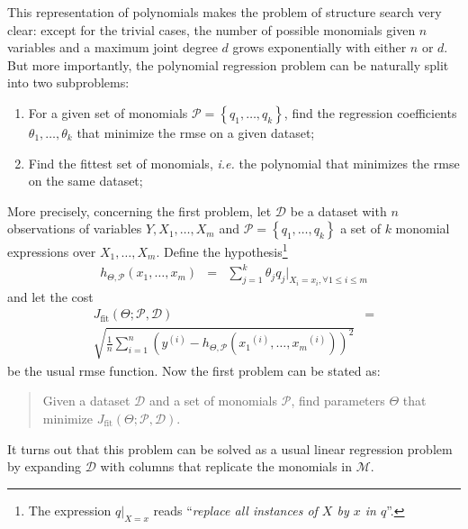 \documentclass[final,authoryear,3p,times,twocolumn]{elsarticle}
\newcommand{\sample}[1]{\ensuremath{^{\left(#1\right)}}}
\begin{document}
This representation of polynomials makes the problem of structure search very clear: except for the trivial cases, the number of possible monomials given $n$ variables and a maximum joint degree $d$ grows exponentially with either $n$ or $d$. But more importantly, the polynomial regression problem can be naturally split into two subproblems:
%
\begin{enumerate}
\item For a given set of monomials $\mathcal{P} = \left\lbrace q_1, \ldots, q_k\right\rbrace$, find the regression coefficients $\theta_1,\ldots,\theta_k$ that minimize the \ac{rmse} on a given dataset;

\item Find the fittest set of monomials, \emph{i.e.} the polynomial that minimizes the \ac{rmse} on the same dataset;
\end{enumerate}
%
More precisely, concerning the first problem, let $\mathcal{D}$ be a dataset with $n$ observations of variables $Y, X_1,\ldots,X_m$ and $\mathcal{P} = \left\lbrace q_1,\ldots, q_k\right\rbrace$ a set of $k$ monomial expressions over $X_1,\ldots,X_m$. Define the hypothesis\footnote{The expression $q|_{X=x}$ reads ``\emph{replace all instances of $X$ by $x$ in $q$}''.}
%
\begin{eqnarray*}
h_{\Theta,\mathcal{P}}\left(x_1,\ldots,x_m\right) &=& \sum_{j = 1}^k \theta_j q_j|_{X_i=x_i,\forall 1 \leq i \leq m}
\end{eqnarray*}
%
and let the cost
%
\begin{eqnarray}
J_{\textrm{fit}}\left(\Theta;\mathcal{P},\mathcal{D}\right)  & =  \nonumber \\
\sqrt{\frac{1}{n}\sum_{i=1}^n \left( y\sample{i} - h_{\Theta,\mathcal{P}}\left( x_1\sample{i},\ldots,x_m\sample{i} \right) \right)^2 }\label{eq:rmse}
\end{eqnarray}
%
be the usual \acf{rmse} function. Now the first problem can be stated as:
%
\begin{quote}
Given a dataset $\mathcal{D}$ and a set of monomials $\mathcal{P}$, find parameters $\Theta$ that minimize $J_{\textrm{fit}}\left(\Theta;\mathcal{P},\mathcal{D}\right)$.
\end{quote}
%
It turns out that this problem can be solved as a usual linear regression problem by expanding $\mathcal{D}$ with columns that replicate the monomials in $\mathcal{M}$.
\end{document}
